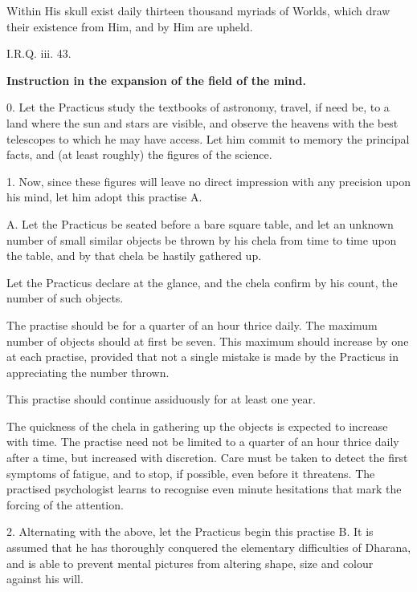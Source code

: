 
\epigraph{Within His skull exist daily thirteen thousand myriads of Worlds, which draw their existence from Him, and by Him are upheld.}{I.R.Q. iii. 43.}

\textbf{Instruction in the expansion of the field of the mind.}


0. Let the Practicus study the textbooks of astronomy, travel, if need be, to a land where the sun and stars are visible, and observe the heavens with the best telescopes to which he may have access. Let him commit to memory the principal facts, and (at least roughly) the figures of the science.

1. Now, since these figures will leave no direct impression with any precision upon his mind, let him adopt this practise A.


\begin{quoting}

A. Let the Practicus be seated before a bare square table, and let an unknown number of small similar objects be thrown by his chela from time to time upon the table, and by that chela be hastily gathered up.

Let the Practicus declare at the glance, and the chela confirm by his count, the number of such objects.

The practise should be for a quarter of an hour thrice daily. The maximum number of objects should at first be seven. This maximum should increase by one at each practise, provided that not a single mistake is made by the Practicus in appreciating the number thrown.

This practise should continue assiduously for at least one year.

The quickness of the chela in gathering up the objects is expected to increase with time. The practise need not be limited to a quarter of an hour thrice daily after a time, but increased with discretion. Care must be taken to detect the first symptoms of fatigue, and to stop, if possible, even before it threatens. The practised psychologist learns to recognise even minute hesitations that mark the forcing of the attention.

\end{quoting}


2. Alternating with the above, let the Practicus begin this practise B. It is assumed that he has thoroughly conquered the elementary difficulties of Dharana, and is able to prevent mental pictures from altering shape, size and colour against his will.


